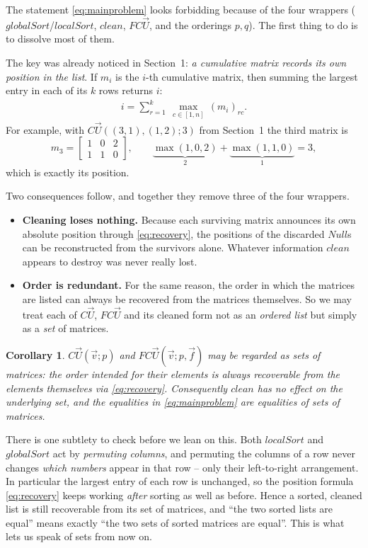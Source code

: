 \documentclass{article}
\newtheorem{corollary}[theorem]{Corollary}
\begin{document}
The statement \eqref{eq:mainproblem} looks forbidding because of the four wrappers
($globalSort$/$localSort$, $clean$, $FC\vec U$, and the orderings $p,q$).  The
first thing to do is to dissolve most of them.

The key was already noticed in Section~1: \emph{a cumulative matrix records its own
position in the list}.  If $m_i$ is the $i$-th cumulative matrix, then summing the
largest entry in each of its $k$ rows returns $i$:
\begin{align}
i=\sum_{r=1}^{k}\ \max_{c\in[1,n]}\,(m_i)_{rc}.
\label{eq:recovery}
\end{align}
For example, with $C\vec U((3,1),(1,2);3)$ from Section~1 the third matrix is
\[
m_3=\begin{bmatrix}1&0&2\\1&1&0\end{bmatrix},
\qquad
\underbrace{\max(1,0,2)}_{2}+\underbrace{\max(1,1,0)}_{1}=3,
\]
which is exactly its position.

Two consequences follow, and together they remove three of the four wrappers.

\begin{itemize}
  \item \textbf{Cleaning loses nothing.}  Because each surviving matrix announces
        its own absolute position through \eqref{eq:recovery}, the positions of the
        discarded $Null$s can be reconstructed from the survivors alone.  Whatever
        information $clean$ appears to destroy was never really lost.
  \item \textbf{Order is redundant.}  For the same reason, the order in which the
        matrices are listed can always be recovered from the matrices themselves.
        So we may treat each of $C\vec U$, $FC\vec U$ and its cleaned form not as an
        \emph{ordered list} but simply as a \emph{set} of matrices.
\end{itemize}

\begin{corollary}\label{cor:sets}
$C\vec U(\vec v;p)$ and $FC\vec U(\vec v;p,\vec f)$ may be regarded as
\emph{sets} of matrices: the order intended for their elements is always
recoverable from the elements themselves via \eqref{eq:recovery}.  Consequently
$clean$ has no effect on the underlying set, and the equalities in
\eqref{eq:mainproblem} are equalities of \emph{sets} of matrices.
\end{corollary}

There is one subtlety to check before we lean on this.  Both $localSort$ and
$globalSort$ act by \emph{permuting columns}, and permuting the columns of a row
never changes \emph{which numbers} appear in that row -- only their left-to-right
arrangement.  In particular the largest entry of each row is unchanged, so the
position formula \eqref{eq:recovery} keeps working \emph{after} sorting as well as
before.  Hence a sorted, cleaned list is still recoverable from its set of
matrices, and ``the two sorted lists are equal'' means exactly ``the two sets of
sorted matrices are equal''.  This is what lets us speak of sets from now on.
\end{document}
